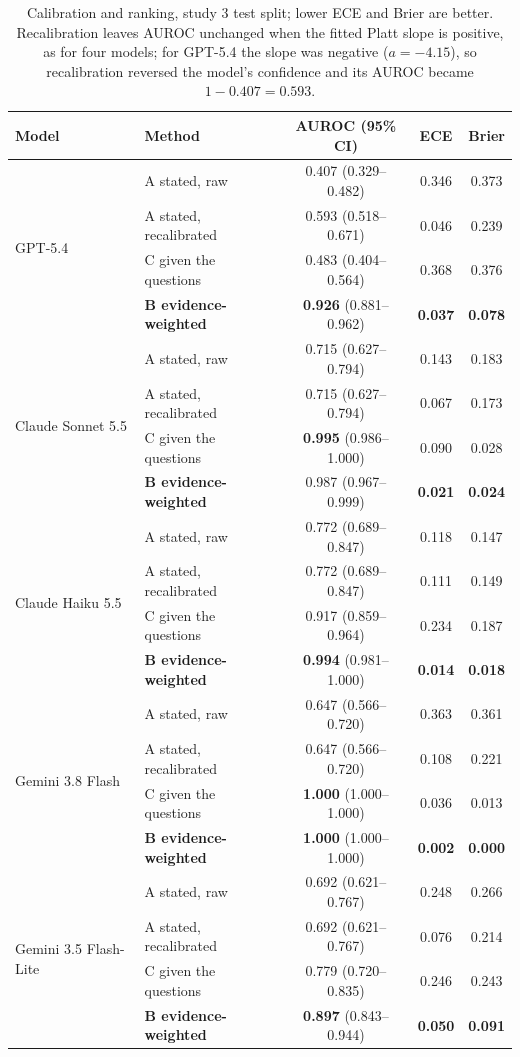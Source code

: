 \documentclass[10pt,letterpaper]{article}
\begin{document}
\begin{table}[!htbp]
\centering\small
\caption{Calibration and ranking, study 3 test split; lower ECE and Brier are better. Recalibration leaves AUROC unchanged when the fitted Platt slope is positive, as for four models; for GPT-5.4 the slope was negative ($a=-4.15$), so recalibration reversed the model's confidence and its AUROC became $1-0.407=0.593$.}\label{tab:main}
\begin{tabular}{@{}llccc@{}}
\toprule
Model & Method & AUROC (95\% CI) & ECE & Brier \\
\midrule
\multirow{4}{*}{GPT-5.4} & A stated, raw & 0.407 (0.329--0.482) & 0.346 & 0.373 \\
 & A stated, recalibrated & 0.593 (0.518--0.671) & 0.046 & 0.239 \\
 & C given the questions & 0.483 (0.404--0.564) & 0.368 & 0.376 \\
 & \textbf{B evidence-weighted} & \textbf{0.926} (0.881--0.962) & \textbf{0.037} & \textbf{0.078} \\
\midrule
\multirow{4}{*}{Claude Sonnet 5.5} & A stated, raw & 0.715 (0.627--0.794) & 0.143 & 0.183 \\
 & A stated, recalibrated & 0.715 (0.627--0.794) & 0.067 & 0.173 \\
 & C given the questions & \textbf{0.995} (0.986--1.000) & 0.090 & 0.028 \\
 & \textbf{B evidence-weighted} & 0.987 (0.967--0.999) & \textbf{0.021} & \textbf{0.024} \\
\midrule
\multirow{4}{*}{Claude Haiku 5.5} & A stated, raw & 0.772 (0.689--0.847) & 0.118 & 0.147 \\
 & A stated, recalibrated & 0.772 (0.689--0.847) & 0.111 & 0.149 \\
 & C given the questions & 0.917 (0.859--0.964) & 0.234 & 0.187 \\
 & \textbf{B evidence-weighted} & \textbf{0.994} (0.981--1.000) & \textbf{0.014} & \textbf{0.018} \\
\midrule
\multirow{4}{*}{Gemini 3.8 Flash} & A stated, raw & 0.647 (0.566--0.720) & 0.363 & 0.361 \\
 & A stated, recalibrated & 0.647 (0.566--0.720) & 0.108 & 0.221 \\
 & C given the questions & \textbf{1.000} (1.000--1.000) & 0.036 & 0.013 \\
 & \textbf{B evidence-weighted} & \textbf{1.000} (1.000--1.000) & \textbf{0.002} & \textbf{0.000} \\
\midrule
\multirow{4}{*}{Gemini 3.5 Flash-Lite} & A stated, raw & 0.692 (0.621--0.767) & 0.248 & 0.266 \\
 & A stated, recalibrated & 0.692 (0.621--0.767) & 0.076 & 0.214 \\
 & C given the questions & 0.779 (0.720--0.835) & 0.246 & 0.243 \\
 & \textbf{B evidence-weighted} & \textbf{0.897} (0.843--0.944) & \textbf{0.050} & \textbf{0.091} \\
\bottomrule
\end{tabular}
\end{table}
\end{document}
